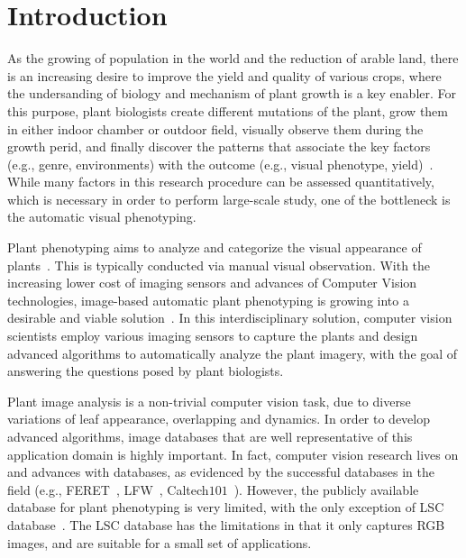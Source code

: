 \section{Introduction}
\label{sec:intro}

As the growing of population in the world and the reduction of arable land, there is an increasing desire to improve the yield and quality of various crops, where the undersanding of biology and mechanism of plant growth is a key enabler.
For this purpose, plant biologists create different mutations of the plant, grow them in either indoor chamber or outdoor field, visually observe them during the growth perid, and finally discover the patterns that associate the   key factors (e.g., genre, environments) with the outcome (e.g., visual phenotype, yield)~\cite{}.
While many factors in this research procedure can be assessed quantitatively, which is necessary in order to perform large-scale study, one of the bottleneck is the automatic visual phenotyping.


Plant phenotyping aims to analyze and categorize the visual appearance of plants~\cite{}.
This is typically conducted via manual visual observation.
With the increasing lower cost of imaging sensors and advances of Computer Vision technologies, image-based automatic plant phenotyping is growing into a desirable and viable solution~\cite{}.
In this interdisciplinary solution, computer vision scientists employ various imaging sensors to capture the plants and design advanced algorithms to automatically analyze the plant imagery, with the goal of answering the questions posed by plant biologists.

Plant image analysis is a non-trivial computer vision task, due to diverse variations of leaf appearance, overlapping and dynamics.
In order to develop advanced algorithms, image databases that are well representative of this application domain is highly important.
In fact, computer vision research lives on and advances with databases, as evidenced by the successful databases in the field (e.g., FERET~\cite{Phillips2000}, LFW~\cite{LFW}, Caltech$101$~\cite{Fei-Fei2004}).
However, the publicly available database for plant phenotyping is very limited, with the only exception of LSC database~\cite{scharr2014annotated}.
The LSC database has the limitations in that it only captures RGB images, and are suitable for a small set of applications.

